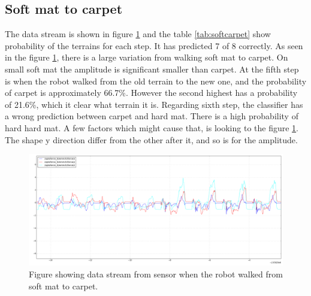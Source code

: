 \documentclass[USenglish]{ifimaster}  %
\begin{document}
\subsection{Soft mat to carpet}
The data stream is shown in figure \ref{fig:softcarpet} and the table \ref{tab:softcarpet} show probability of the terrains for each step. It has predicted 7 of 8 correctly. As seen in the figure \ref{fig:softcarpet}, there is a large variation from walking soft mat to carpet. On small soft mat the amplitude is significant smaller than carpet. At the fifth step is when the robot walked from the old terrain to the new one, and the probability of carpet is approximately 66.7\%. However the second highest has a probability of 21.6\%, which it clear what terrain it is. Regarding sixth step, the classifier has a wrong prediction between carpet and hard mat. There is a high probability of hard hard mat. A few factors which might cause that, is looking to the figure \ref{fig:softcarpet}. The shape y direction differ from the other after it, and so is for the amplitude.
	
	
	
	\begin{figure}[h]
		\centering
		\includegraphics[width=\textwidth,height=\textheight,keepaspectratio]{Figures/MM4Teppe2}
		\caption{Figure showing data stream from sensor when the robot walked from soft mat to carpet.}
		\label{fig:softcarpet}
	\end{figure}
	
\end{document}
